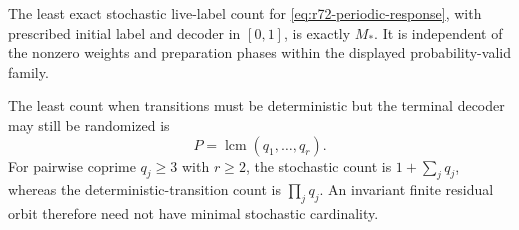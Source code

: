 \begin{theorem}\label{thm:r72-periodic-memory}
The least exact stochastic live-label count for \eqref{eq:r72-periodic-response}, with prescribed initial label and decoder in $[0,1]$, is exactly $M_*$. It is independent of the nonzero weights and preparation phases within the displayed probability-valid family.

The least count when transitions must be deterministic but the terminal decoder may still be randomized is
\[
 P=\operatorname{lcm}(q_1,\ldots,q_r).
\]
For pairwise coprime $q_j\ge3$ with $r\ge2$, the stochastic count is $1+\sum_jq_j$, whereas the deterministic-transition count is $\prod_jq_j$. An invariant finite residual orbit therefore need not have minimal stochastic cardinality.
\end{theorem}
